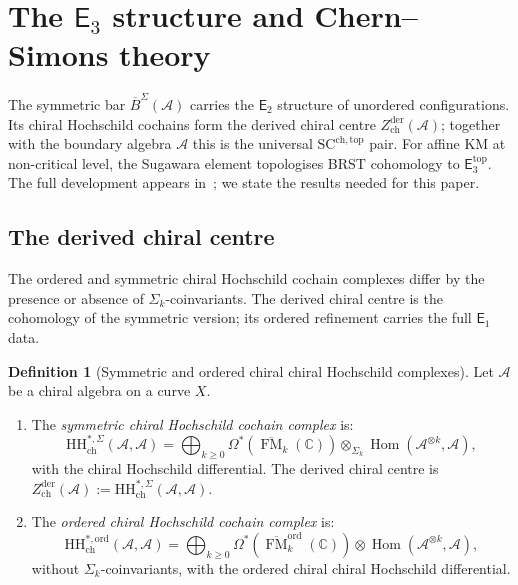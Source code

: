 \documentclass[11pt,reqno]{amsart}
\theoremstyle{definition}
\newtheorem{definition}[theorem]{Definition}
\theoremstyle{remark}
\newcommand{\cA}{\mathcal{A}}
\newcommand{\HH}{\mathrm{HH}}
\newcommand{\Eone}{\mathsf{E}_{1}}
\newcommand{\Etwo}{\mathsf{E}_{2}}
\providecommand{\Ethree}{\mathsf{E}_{3}}
\DeclareMathOperator{\Hom}{Hom}
\DeclareMathOperator{\FM}{FM}
\newcommand{\BarSig}{\overline{B}^{\Sigma}}
\newcommand{\CC}{\mathbb{C}}
\numberwithin{equation}{section}
\begin{document}
\section{The $\Ethree$ structure and Chern--Simons theory}
\label{sec:e3}

The symmetric bar $\BarSig(\cA)$ carries the $\Etwo$
structure of unordered configurations. Its chiral Hochschild
cochains form the derived chiral centre
$Z^{\mathrm{der}}_{\mathrm{ch}}(\cA)$; together with the
boundary algebra $\cA$ this is the universal
$\mathrm{SC}^{\mathrm{ch,top}}$ pair. For affine KM at
non-critical level, the Sugawara element topologises BRST
cohomology to $\Ethree^{\mathrm{top}}$. The full development
appears in~\cite[\S I.4, \S IV]{Lorgat26I};
we state the results needed for this paper.

\subsection{The derived chiral centre}
\label{subsec:derived-centre}

The ordered and symmetric chiral Hochschild cochain complexes
differ by the presence or absence of
$\Sigma_k$-coinvariants. The derived chiral centre is the
cohomology of the symmetric version; its ordered refinement
carries the full $\Eone$ data.

\begin{definition}[Symmetric and ordered chiral
chiral Hochschild complexes]
\label{def:ch-hochschild}
Let $\cA$ be a chiral algebra on a curve $X$.
\begin{enumerate}[label=\textup{(\roman*)}]
\item The \emph{symmetric chiral Hochschild cochain complex}
  is:
  \begin{equation}\label{eq:sym-hh}
    \HH^{*,\Sigma}_{\mathrm{ch}}(\cA, \cA)
    = \bigoplus_{k \geq 0}
    \Omega^*(\overline{\FM}_k(\CC))
    \otimes_{\Sigma_k}
    \Hom(\cA^{\otimes k}, \cA),
  \end{equation}
  with the chiral Hochschild differential.
  The derived chiral centre is
  $Z^{\mathrm{der}}_{\mathrm{ch}}(\cA)
  := \HH^{*,\Sigma}_{\mathrm{ch}}(\cA, \cA)$.
\item The \emph{ordered chiral Hochschild cochain complex}
  is:
  \begin{equation}\label{eq:ord-hh}
    \HH^{*,\mathrm{ord}}_{\mathrm{ch}}(\cA, \cA)
    = \bigoplus_{k \geq 0}
    \Omega^*(\overline{\FM}_k^{\mathrm{ord}}(\CC))
    \otimes
    \Hom(\cA^{\otimes k}, \cA),
  \end{equation}
  without $\Sigma_k$-coinvariants, with the ordered chiral
  chiral Hochschild differential.
\end{enumerate}
\end{definition}
\end{document}
